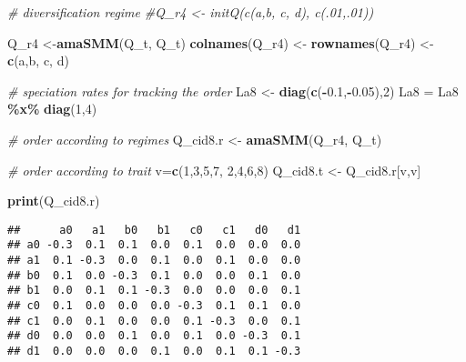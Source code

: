 \documentclass[
]{article}
\newenvironment{Shaded}{\begin{snugshade}}{\end{snugshade}}
\newcommand{\CommentTok}[1]{\textcolor[rgb]{0.56,0.35,0.01}{\textit{#1}}}
\newcommand{\DecValTok}[1]{\textcolor[rgb]{0.00,0.00,0.81}{#1}}
\newcommand{\FloatTok}[1]{\textcolor[rgb]{0.00,0.00,0.81}{#1}}
\newcommand{\FunctionTok}[1]{\textcolor[rgb]{0.13,0.29,0.53}{\textbf{#1}}}
\newcommand{\NormalTok}[1]{#1}
\newcommand{\OtherTok}[1]{\textcolor[rgb]{0.56,0.35,0.01}{#1}}
\newcommand{\SpecialCharTok}[1]{\textcolor[rgb]{0.81,0.36,0.00}{\textbf{#1}}}
\newcommand{\StringTok}[1]{\textcolor[rgb]{0.31,0.60,0.02}{#1}}
\begin{document}
\begin{Shaded}
\begin{Highlighting}[]
\CommentTok{\# diversification regime}
\CommentTok{\#Q\_r4 \textless{}{-} initQ(c(\textquotesingle{}a\textquotesingle{},\textquotesingle{}b\textquotesingle{}, \textquotesingle{}c\textquotesingle{}, \textquotesingle{}d\textquotesingle{}), c(.01,.01))}

\NormalTok{Q\_r4 }\OtherTok{\textless{}{-}}\FunctionTok{amaSMM}\NormalTok{(Q\_t, Q\_t) }
\FunctionTok{colnames}\NormalTok{(Q\_r4) }\OtherTok{\textless{}{-}} \FunctionTok{rownames}\NormalTok{(Q\_r4) }\OtherTok{\textless{}{-}} \FunctionTok{c}\NormalTok{(}\StringTok{\textquotesingle{}a\textquotesingle{}}\NormalTok{,}\StringTok{\textquotesingle{}b\textquotesingle{}}\NormalTok{, }\StringTok{\textquotesingle{}c\textquotesingle{}}\NormalTok{, }\StringTok{\textquotesingle{}d\textquotesingle{}}\NormalTok{)}

\CommentTok{\# speciation rates for tracking the order}
\NormalTok{La8 }\OtherTok{\textless{}{-}} \FunctionTok{diag}\NormalTok{(}\FunctionTok{c}\NormalTok{(}\SpecialCharTok{{-}}\FloatTok{0.1}\NormalTok{,}\SpecialCharTok{{-}}\FloatTok{0.05}\NormalTok{),}\DecValTok{2}\NormalTok{)}
\NormalTok{La8 }\OtherTok{=}\NormalTok{ La8 }\SpecialCharTok{\%x\%} \FunctionTok{diag}\NormalTok{(}\DecValTok{1}\NormalTok{,}\DecValTok{4}\NormalTok{)}

\CommentTok{\# order according to regimes}
\NormalTok{Q\_cid8.r }\OtherTok{\textless{}{-}} \FunctionTok{amaSMM}\NormalTok{(Q\_r4, Q\_t) }

\CommentTok{\# order according to trait}
\NormalTok{v}\OtherTok{=}\FunctionTok{c}\NormalTok{(}\DecValTok{1}\NormalTok{,}\DecValTok{3}\NormalTok{,}\DecValTok{5}\NormalTok{,}\DecValTok{7}\NormalTok{, }\DecValTok{2}\NormalTok{,}\DecValTok{4}\NormalTok{,}\DecValTok{6}\NormalTok{,}\DecValTok{8}\NormalTok{)}
\NormalTok{Q\_cid8.t }\OtherTok{\textless{}{-}}\NormalTok{ Q\_cid8.r[v,v]}

\FunctionTok{print}\NormalTok{(Q\_cid8.r)}
\end{Highlighting}
\end{Shaded}

\begin{verbatim}
##      a0   a1   b0   b1   c0   c1   d0   d1
## a0 -0.3  0.1  0.1  0.0  0.1  0.0  0.0  0.0
## a1  0.1 -0.3  0.0  0.1  0.0  0.1  0.0  0.0
## b0  0.1  0.0 -0.3  0.1  0.0  0.0  0.1  0.0
## b1  0.0  0.1  0.1 -0.3  0.0  0.0  0.0  0.1
## c0  0.1  0.0  0.0  0.0 -0.3  0.1  0.1  0.0
## c1  0.0  0.1  0.0  0.0  0.1 -0.3  0.0  0.1
## d0  0.0  0.0  0.1  0.0  0.1  0.0 -0.3  0.1
## d1  0.0  0.0  0.0  0.1  0.0  0.1  0.1 -0.3
\end{verbatim}
\end{document}

